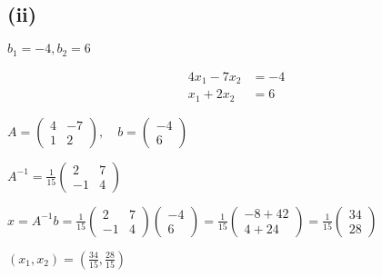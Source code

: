 \subsection*{(ii)} $b_1 = -4, b_2 = 6$

\begin{align}
	4x_1 - 7x_2 & = -4 \\
	x_1 + 2x_2  & = 6
\end{align}

$A = \begin{pmatrix}
	4 & -7 \\
	1 & 2
\end{pmatrix}, \quad b = \begin{pmatrix}
	-4 \\
	6
\end{pmatrix}$

$A^{-1} = \frac{1}{15}\begin{pmatrix}
	2 & 7 \\
	-1 & 4
\end{pmatrix}$

$x = A^{-1}b = \frac{1}{15}\begin{pmatrix}
	2 & 7 \\
	-1 & 4
\end{pmatrix}\begin{pmatrix}
	-4 \\
	6
\end{pmatrix} = \frac{1}{15}\begin{pmatrix}
	-8 + 42 \\
	4 + 24
\end{pmatrix} = \frac{1}{15}\begin{pmatrix}
	34 \\
	28
\end{pmatrix}$

$\boxed{(x_1, x_2) = \left(\frac{34}{15}, \frac{28}{15}\right)}$